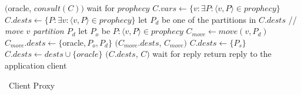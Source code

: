 \begin{algorithm}[h!]
\small

\begin{distribalgo}[1]

\vspace{1.0mm}


\vspace{1.0mm}

        \STATE \amcast$($oracle, $consult(C))$
        \STATE wait for $prophecy$
        \STATE $C.vars \leftarrow \{v: \exists P : \langle v, P \rangle \in prophecy \}$
        \STATE $C.dests \leftarrow \{P: \exists v : \langle v, P \rangle \in prophecy \}$
            \STATE let $P_d$ be one of the partitions in $C.dests$
                \STATE // \textit{move $v$ partition $P_d$}
                \STATE let $P_o$ be $P : \langle v, P \rangle \in prophecy$
                    \STATE $C_{move} \leftarrow move(v,P_d)$
                    \STATE $C_{move}.dests \leftarrow \{$oracle$,P_o,P_d\}$
                    \STATE \amcast$(C_{move}.dests$, $C_{move})$
                \ENDIF
            \ENDFOR
            \STATE $C.dests \leftarrow \{ P_s \}$
        \ENDIF
            \STATE $C.dests \leftarrow dests \cup \{oracle\}$
        \ENDIF
        \STATE \amcast$(C.dests$, $C)$
        \STATE wait for reply
    \ENDINDENT
    \STATE return reply to the application client
\ENDINDENT

\caption{\dssmr\ Client Proxy}
\label{alg:client_proxy}
\end{distribalgo}
\end{algorithm}